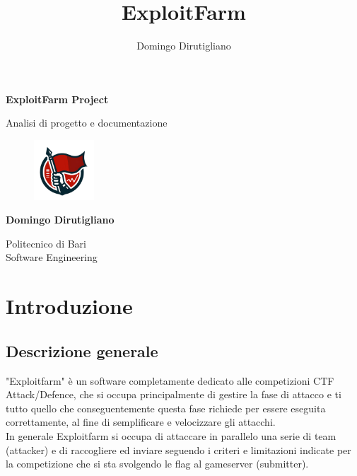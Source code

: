 \documentclass[11pt]{article}
\title{ExploitFarm}
\author{Domingo Dirutigliano}
\begin{document}
\begin{titlepage}
   \begin{center}
       \vspace*{1cm}

       \LARGE{\textbf{ExploitFarm Project}}

       \vspace{0.5cm}
        Analisi di progetto e documentazione
       
       \vspace{0.5cm}
       
       \begin{figure}[H]
    		\centering
    		\includegraphics[width=0.2\textwidth]{logo.png}
		\end{figure}
       
       \vspace{0.5cm}

       \textbf{Domingo Dirutigliano}

       \vfill
            
       Politecnico di Bari\\
       Software Engineering
            
       \vspace{0.1cm}
   \end{center}
\end{titlepage}

\tableofcontents
\newpage

\section{Introduzione}
\subsection{Descrizione generale}
	"Exploitfarm" è un software completamente dedicato alle competizioni CTF Attack/Defence, che si occupa principalmente di gestire la fase di attacco e ti tutto quello che conseguentemente questa fase richiede per essere eseguita correttamente, al fine di semplificare e velocizzare gli attacchi.\\
	In generale Exploitfarm si occupa di attaccare in parallelo una serie di team (attacker) e di raccogliere ed inviare seguendo i criteri e limitazioni indicate per la competizione che si sta svolgendo le flag al gameserver (submitter).
\end{document}
